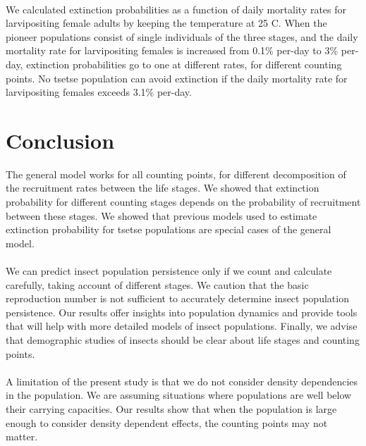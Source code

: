 \documentclass[smallextended]{svjour3}
\begin{document}
\paragraph{}
We calculated extinction probabilities as a function of daily mortality rates for larvipositing female adults by keeping the temperature at 25 \degree C. When the pioneer populations consist of single individuals of the three stages, and the daily mortality rate for larvipositing females is increased from 0.1\% per-day to 3\% per-day, extinction probabilities go to one at different rates, for different counting points. No tsetse population can avoid extinction if the daily mortality rate for larvipositing females exceeds 3.1\% per-day\cite{Are2019}.

\section{Conclusion}

The general model works for all counting points, for different decomposition of the recruitment rates between the life stages. We showed that extinction probability for different counting stages depends on the probability of recruitment between these stages. We showed that previous models used to estimate extinction probability for tsetse populations are special cases of the general model. 
\paragraph{}
We can predict insect population persistence only if we count and calculate carefully, taking account of different stages. We caution that the basic reproduction number is not sufficient to accurately determine insect population persistence. Our results offer insights into population dynamics and provide tools that will help with more detailed models of insect populations. Finally, we advise that demographic studies of insects should be clear about life stages and counting points.
\paragraph{}
A limitation of the present study is that we do not consider density dependencies in the population. We are assuming situations where populations are well below their carrying capacities. Our results show that when the population is large enough to consider density dependent effects, the counting points may not matter.


\end{document}
